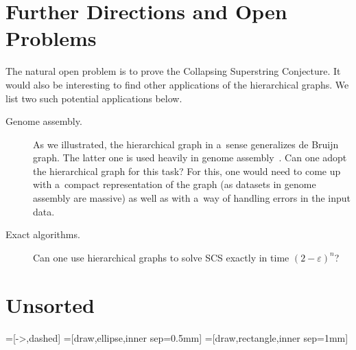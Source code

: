 \documentclass[11pt,letterpaper]{article}
\begin{document}
\section{Further Directions and Open Problems}
The natural open problem is to prove the Collapsing Superstring Conjecture.
It would also be interesting to find other applications of the 
hierarchical graphs. We list two such potential applications below.
\begin{description}
\item[Genome assembly.] As we illustrated, the hierarchical graph in a~sense
generalizes de Bruijn graph. The latter one is used heavily 
in genome assembly~\cite{}.
Can one adopt the hierarchical graph for this task? For this, one
would need to come up with a~compact representation of the graph
(as datasets in genome assembly are massive) as well as with a~way of
handling errors in the input data.

\item[Exact algorithms.] Can one use hierarchical graphs to solve SCS exactly in time $(2-\varepsilon)^n$?
\end{description}

\section{Unsorted}

=[->,dashed]
=[draw,ellipse,inner sep=0.5mm]
=[draw,rectangle,inner sep=1mm]
\end{document}

